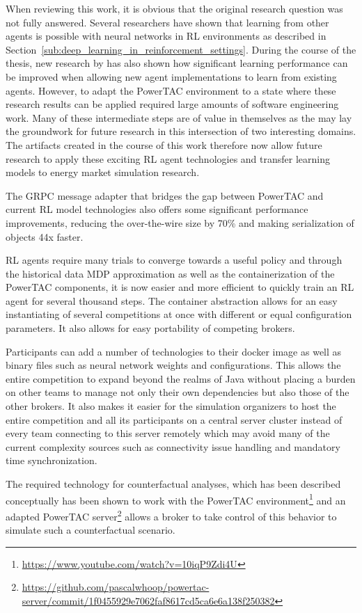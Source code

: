 When reviewing this work, it is obvious that the original research question was not fully answered. Several researchers
have shown that learning from other agents is possible with neural networks in \ac{RL} environments as described in
Section~\ref{sub:deep_learning_in_reinforcement_settings}. During the course of the thesis, new research by
\citet{schmitt2018kickstarting}  has also shown how significant learning performance can be improved when allowing new
agent implementations to learn from existing agents.
However, to adapt the \ac{PowerTAC} environment to a state where these research results can be applied required large
amounts of software engineering work. Many of these intermediate steps are of value in themselves as the may lay the
groundwork for future research in this intersection of two interesting domains. The artifacts created in the course of
this work therefore now allow future research to apply these exciting \ac{RL} agent technologies and transfer learning
models to energy market simulation research. 

The \ac{GRPC} message adapter that bridges the gap between \ac{PowerTAC} and current \ac{RL} model technologies also offers some
significant performance improvements, reducing the over-the-wire size by 70\% and making serialization of objects 44x
faster.

\ac{RL} agents require many trials to converge towards a useful policy and through the historical data \ac{MDP}
approximation as well as the containerization of the \ac{PowerTAC} components, it is now easier and more efficient
to quickly train an \ac{RL} agent for several thousand steps. The container abstraction allows for an easy instantiating
of several competitions at once with different or equal configuration parameters. It also allows for easy portability of
competing brokers.

Participants can add a number of technologies to their docker image as well as binary files such as neural network weights and
configurations. This allows the entire competition to expand beyond the realms of Java without placing a burden on other
teams to manage not only their own dependencies but also those of the other brokers. It also makes it easier for the simulation
organizers to host the entire competition and all its participants on a central server cluster instead of every team connecting to
this server remotely which may avoid many of the current complexity sources such as connectivity issue handling and mandatory
time synchronization.

The required technology for counterfactual analyses, which has been described conceptually has been shown to work with
the \ac{PowerTAC} environment\footnote{\url{https://www.youtube.com/watch?v=10iqP9Zdi4U}} and an adapted \ac{PowerTAC}
server\footnote{\url{https://github.com/pascalwhoop/powertac-server/commit/1f0455929e7062faf8617cd5ca6e6a138f250382}}
allows a broker to take control of this behavior to simulate such a counterfactual scenario.

